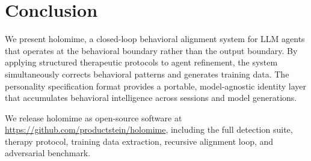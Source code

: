 \documentclass[11pt,a4paper]{article}
\begin{document}
\section{Conclusion}

We present holomime, a closed-loop behavioral alignment system for LLM agents that operates at the behavioral boundary rather than the output boundary. By applying structured therapeutic protocols to agent refinement, the system simultaneously corrects behavioral patterns and generates training data. The personality specification format provides a portable, model-agnostic identity layer that accumulates behavioral intelligence across sessions and model generations.

We release holomime as open-source software at \url{https://github.com/productstein/holomime}, including the full detection suite, therapy protocol, training data extraction, recursive alignment loop, and adversarial benchmark.



\end{document}
